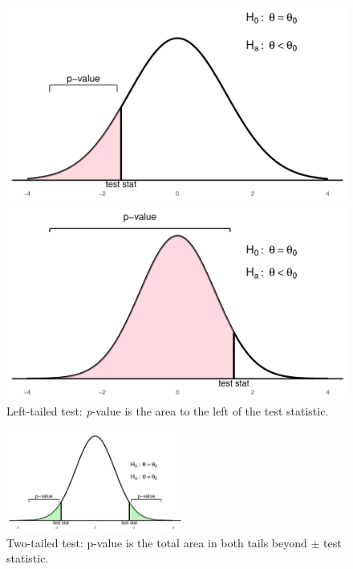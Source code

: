 \begin{figure}[H]
  \centering
  \begin{minipage}{0.48\textwidth}
    \centering
    \includegraphics[width=\textwidth]{section11/images/hypothesis_left_tail.pdf}
  \end{minipage}
  \hfill
  \begin{minipage}{0.48\textwidth}
    \centering
    \includegraphics[width=\textwidth]{section11/images/hypothesis_left_tail_wide.pdf}
  \end{minipage}
\caption{Left-tailed test: \textit{p}-value is the area to the left of the test statistic.}
\end{figure}

\begin{figure}[H]
  \centering
  \includegraphics[width=0.52\textwidth]{section11/images/hypothesis_two_tail.pdf}
  \caption{Two-tailed test: p-value is the total area in both tails beyond $\pm$ test statistic.}
\end{figure}
